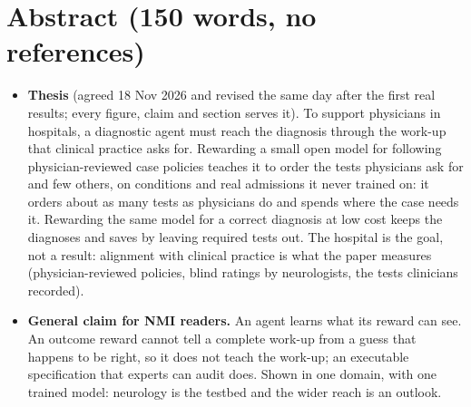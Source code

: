 
\section*{Abstract (150 words, no references)}


\content
\begin{itemize}
\item \textbf{Thesis} (agreed 18 Nov 2026 and revised the same day after the first real results;
every figure, claim and section serves it). To support physicians in hospitals, a diagnostic agent
must reach the diagnosis through the work-up that clinical practice asks for. Rewarding a small open
model for following physician-reviewed case policies teaches it to order the tests physicians ask for
and few others, on conditions and real admissions it never trained on: it orders about as many tests
as physicians do and spends where the case needs it. Rewarding the same model for a correct diagnosis
at low cost keeps the diagnoses and saves by leaving required tests out.
The hospital is the goal, not a result: alignment with clinical practice is what the paper measures
(physician-reviewed policies, blind ratings by neurologists, the tests clinicians recorded).
\item \textbf{General claim for NMI readers.} An agent learns what its reward can see. An outcome
reward cannot tell a complete work-up from a guess that happens to be right, so it does not teach the
work-up; an executable specification that experts can audit does. Shown in one domain, with one
trained model: neurology is the testbed and the wider reach is an outlook.
\end{itemize}

